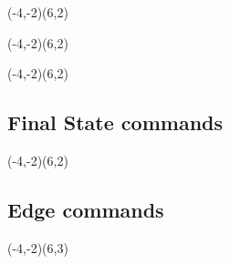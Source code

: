 \begin{VCPicture}{(-4,-2)(6,2)}
\HideState
{} 
\ShowState
{}  
\end{VCPicture} 
\vspace{2in}

\begin{VCPicture}{(-4,-2)(6,2)}
\ShowState
{}  
\end{VCPicture} 
\vspace{2in}

\begin{VCPicture}{(-4,-2)(6,2)}
  
 
  
 
\end{VCPicture} 



\subsection{Final State commands}
\begin{VCPicture}{(-4,-2)(6,2)}

  
 
 
 
  
 

\end{VCPicture}%

\subsection{Edge commands}
\begin{VCPicture}{(-4,-2)(6,3)}

  
  
  

\end{VCPicture}


